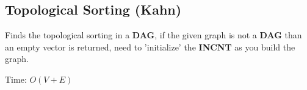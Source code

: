 \subsection{Topological Sorting (Kahn)}

Finds the topological sorting in a \textbf{DAG}, if the given graph is not a \textbf{DAG} than an empty vector is returned, need to 'initialize' the \textbf{INCNT} as you build the graph.

Time: $O(V + E)$
